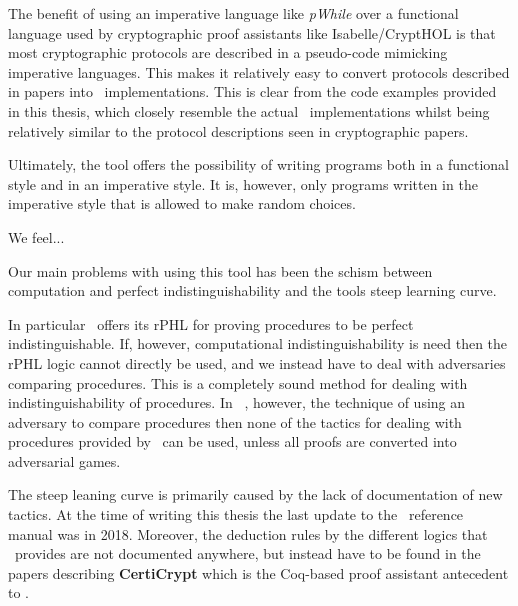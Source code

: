 The benefit of using an imperative language like \textit{pWhile} over a functional
language used by cryptographic proof assistants like Isabelle/CryptHOL is that most
cryptographic protocols are described in a pseudo-code mimicking imperative
languages. This makes it relatively easy to convert protocols described in
papers into \easycrypt\ implementations. This is clear from the code examples
provided in this thesis, which closely resemble the actual \easycrypt\
implementations whilst being relatively similar to the protocol descriptions
seen in cryptographic papers.

Ultimately, the tool offers the possibility of writing programs both in a
functional style and in an imperative style. It is, however, only programs
written in the imperative style that is allowed to make random choices.

We feel...

Our main problems with using this tool has been the schism between computation
and perfect indistinguishability and the tools steep learning curve.

In particular \easycrypt\ offers its rPHL for proving procedures to be perfect
indistinguishable. If, however, computational indistinguishability is need then
the rPHL logic cannot directly be used, and we instead have to deal with
adversaries comparing procedures. This is a completely sound method for dealing
with indistinguishability of procedures. In \easycrypt\ , however, the technique
of using an adversary to compare procedures then none of the tactics for dealing
with procedures provided by \easycrypt\ can be used, unless all proofs are
converted into adversarial games. \todo{rewrite}

The steep leaning curve is primarily caused by the lack of documentation of new
tactics. At the time of writing this thesis the last update to the \easycrypt\
reference manual \cite{ec_refman} was in 2018. Moreover, the deduction rules by
the different logics that \easycrypt\ provides are not documented anywhere, but
instead have to be found in the papers describing \textbf{CertiCrypt} which is
the Coq-based proof assistant antecedent to \easycrypt.

\todo{Possible code extraction?}


